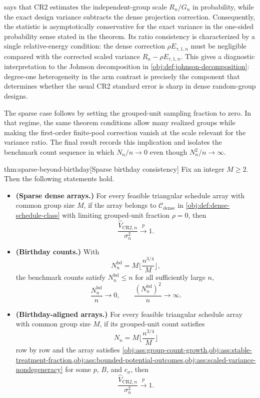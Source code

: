  says that CR2 estimates the independent-group scale \(R_n/G_n\) in probability, while the exact design variance subtracts the dense projection correction. Consequently, the statistic is asymptotically conservative for the exact variance in the one-sided probability sense stated in the theorem. Its ratio consistency is characterized by a single relative-energy condition: the dense correction \(\rho E_{\tau,1,n}\) must be negligible compared with the corrected scaled variance \(R_n-\rho E_{\tau,1,n}\). This gives a diagnostic interpretation to the Johnson decomposition in \cref{obj:def:johnson-decomposition}: degree-one heterogeneity in the arm contrast is precisely the component that determines whether the usual CR2 standard error is sharp in dense random-group designs.

The sparse case follows by setting the grouped-unit sampling fraction to zero. In that regime, the same theorem conditions allow many realized groups while making the first-order finite-pool correction vanish at the scale relevant for the variance ratio. The final result records this implication and isolates the benchmark count sequence in which \(N_n/n\to0\) even though \(N_n^2/n\to\infty\).

\begin{theoremv}{thm:sparse-beyond-birthday}[Sparse birthday consistency]
Fix an integer \(M\ge 2\).  Then the following statements hold.
\begin{itemize}
\item \textbf{(Sparse dense arrays.)} For every feasible triangular schedule array with common group size \(M\), if the array belongs to \(\mathcal C_{\mathrm{dense}}\) in \cref{obj:def:dense-schedule-class} with limiting grouped-unit fraction \(\rho=0\), then
\[
\frac{\widehat V_{\mathrm{CR2},n}}{\sigma_n^2}\xrightarrow{p}1 .
\]
\item \textbf{(Birthday counts.)} With
\[
N_n^{\mathrm{bd}}=M\Big\lfloor \frac{n^{3/4}}{M}\Big\rfloor ,
\]
the benchmark counts satisfy \(N_n^{\mathrm{bd}}\le n\) for all sufficiently large \(n\),
\[
\frac{N_n^{\mathrm{bd}}}{n}\to 0,
\qquad
\frac{(N_n^{\mathrm{bd}})^2}{n}\to\infty .
\]
\item \textbf{(Birthday-aligned arrays.)} For every feasible triangular schedule array with common group size \(M\), if its grouped-unit count satisfies
\[
N_n=M\Big\lfloor \frac{n^{3/4}}{M}\Big\rfloor
\]
row by row and the array satisfies \cref{obj:ass:group-count-growth,obj:ass:stable-treatment-fraction,obj:ass:bounded-potential-outcomes,obj:ass:scaled-variance-nondegeneracy} for some \(p\), \(B\), and \(c_\sigma\), then
\[
\frac{\widehat V_{\mathrm{CR2},n}}{\sigma_n^2}\xrightarrow{p}1 .
\]
\end{itemize}
\end{theoremv}

